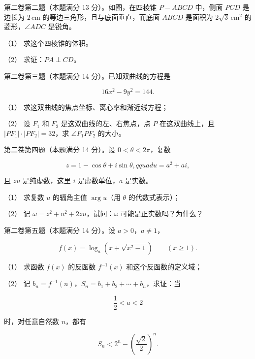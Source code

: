 \begin{question}

第二卷第二题（本题满分 13 分）。如图，在四棱锥 $P-ABCD$ 中，侧面 $PCD$ 是边长为 $2\,\mathrm{cm}$ 的等边三角形，且与底面垂直，而底面 $ABCD$ 是面积为 $2\sqrt3\,\mathrm{cm}^2$ 的菱形，$\angle ADC$ 是锐角。
\nopagebreak[4]
\begin{center}\end{center}
\nopagebreak[4]
（1） 求这个四棱锥的体积。

（2） 求证：$PA\perp CD$。

\end{question}
\begin{question}

第二卷第三题（本题满分 14 分）。已知双曲线的方程是

\nopagebreak[4]
\[
16x^2-9y^2=144.
\]

（1） 求这双曲线的焦点坐标、离心率和渐近线方程；

（2） 设 $F_1$ 和 $F_2$ 是这双曲线的左、右焦点，点 $P$ 在这双曲线上，且 $|PF_1|\cdot|PF_2|=32$，求 $\angle F_1PF_2$ 的大小。

\end{question}
\begin{question}

第二卷第四题（本题满分 14 分）。设 $0<\theta<2\pi$，复数

\nopagebreak[4]
\[
z=1-\cos\theta+i\sin\theta,qquad u=a^2+ai,
\]

且 $zu$ 是纯虚数，这里 $i$ 是虚数单位，$a$ 是实数。

（1） 求复数 $u$ 的辐角主值 $\arg u$（用 $\theta$ 的代数式表示）；

（2） 记 $\omega=z^2+u^2+2zu$，试问：$\omega$ 可能是正实数吗？为什么？

\end{question}
\begin{question}

第二卷第五题（本题满分 14 分）。设 $a>0$，$a\ne1$，

\nopagebreak[4]
\[
f(x)=\log_a\left(x+\sqrt{x^2-1}\right)\qquad(x\ge1).
\]

（1） 求函数 $f(x)$ 的反函数 $f^{-1}(x)$ 和这个反函数的定义域；

（2） 记 $b_n=f^{-1}(n)$，$S_n=b_1+b_2+\cdots+b_n$，求证：当

\nopagebreak[4]
\[
\frac12<a<2
\]

时，对任意自然数 $n$，都有

\nopagebreak[4]
\[
S_n<2^n-\left(\frac{\sqrt2}{2}\right)^n.
\]

\end{question}